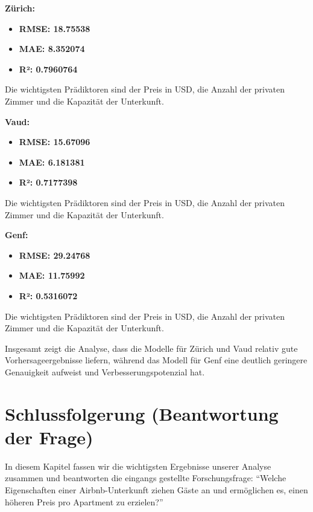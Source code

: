 \documentclass[
  journal,
]{IEEEtran}%
\begin{document}
\textbf{Zürich:}

\begin{itemize}
\item
  \textbf{RMSE: 18.75538}
\item
  \textbf{MAE: 8.352074}
\item
  \textbf{R²: 0.7960764}
\end{itemize}

Die wichtigsten Prädiktoren sind der Preis in USD, die Anzahl der
privaten Zimmer und die Kapazität der Unterkunft.

\textbf{Vaud:}

\begin{itemize}
\item
  \textbf{RMSE: 15.67096}
\item
  \textbf{MAE: 6.181381}
\item
  \textbf{R²: 0.7177398}
\end{itemize}

Die wichtigsten Prädiktoren sind der Preis in USD, die Anzahl der
privaten Zimmer und die Kapazität der Unterkunft.

\textbf{Genf:}

\begin{itemize}
\item
  \textbf{RMSE: 29.24768}
\item
  \textbf{MAE: 11.75992}
\item
  \textbf{R²: 0.5316072}
\end{itemize}

Die wichtigsten Prädiktoren sind der Preis in USD, die Anzahl der
privaten Zimmer und die Kapazität der Unterkunft.

Insgesamt zeigt die Analyse, dass die Modelle für Zürich und Vaud
relativ gute Vorhersageergebnisse liefern, während das Modell für Genf
eine deutlich geringere Genauigkeit aufweist und Verbesserungspotenzial
hat.

\hypertarget{schlussfolgerung-beantwortung-der-frage}{%
\section{Schlussfolgerung (Beantwortung der
Frage)}\label{schlussfolgerung-beantwortung-der-frage}}

In diesem Kapitel fassen wir die wichtigsten Ergebnisse unserer Analyse
zusammen und beantworten die eingangs gestellte Forschungsfrage:
``Welche Eigenschaften einer Airbnb-Unterkunft ziehen Gäste an und
ermöglichen es, einen höheren Preis pro Apartment zu erzielen?''
\end{document}
